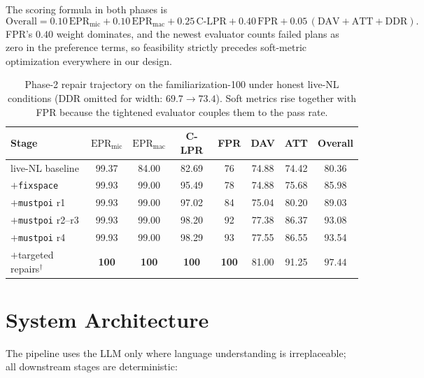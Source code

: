\documentclass[11pt,a4paper]{article}
\begin{document}
\noindent
The scoring formula in both phases is
\begin{equation*}
\mathrm{Overall} = 0.10\,\mathrm{EPR_{mic}} + 0.10\,\mathrm{EPR_{mac}}
 + 0.25\,\mathrm{C\mbox{-}LPR} + 0.40\,\mathrm{FPR}
 + 0.05\,(\mathrm{DAV} + \mathrm{ATT} + \mathrm{DDR}).
\end{equation*}
FPR's $0.40$ weight dominates, and the newest evaluator counts failed plans as
zero in the preference terms, so feasibility strictly precedes soft-metric
optimization everywhere in our design.

\begin{table}[h]
\centering
\small
\begin{tabular}{lccccccc}
\toprule
Stage & $\mathrm{EPR_{mic}}$ & $\mathrm{EPR_{mac}}$ & C-LPR & FPR & DAV & ATT & Overall\\
\midrule
live-NL baseline           & 99.37 & 84.00 & 82.69 & 76 & 74.88 & 74.42 & 80.36\\
$+$\texttt{fixspace}       & 99.93 & 99.00 & 95.49 & 78 & 74.88 & 75.68 & 85.98\\
$+$\texttt{mustpoi} r1     & 99.93 & 99.00 & 97.02 & 84 & 75.04 & 80.20 & 89.03\\
$+$\texttt{mustpoi} r2--r3 & 99.93 & 99.00 & 98.20 & 92 & 77.38 & 86.37 & 93.08\\
$+$\texttt{mustpoi} r4     & 99.93 & 99.00 & 98.29 & 93 & 77.55 & 86.55 & 93.54\\
$+$targeted repairs$^\dagger$ & \textbf{100} & \textbf{100} & \textbf{100} & \textbf{100} & 81.00 & 91.25 & $\mathbf{97.44}$\\
\bottomrule
\end{tabular}
\caption{Phase-2 repair trajectory on the familiarization-100 under honest
live-NL conditions (DDR omitted for width: $69.7\!\to\!73.4$). Soft metrics
rise together with FPR because the tightened evaluator couples them to the
pass rate.}
\label{tab:trajectory}
\end{table}

\section{System Architecture}

The pipeline uses the LLM only where language understanding is irreplaceable;
all downstream stages are deterministic:
\end{document}
